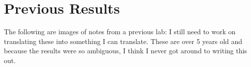 \documentclass{article}
\begin{document}
\section{Previous Results}

The following are images of notes from a previous lab: I still need to work on translating these into something I can translate. These are over 5 years old and because the results were so ambiguous, I think I never got around to writing this out.

\begin{figure}
	\label{fig:IMG_0578}
\end{figure}

\begin{figure}
	\label{fig:IMG_0576}
\end{figure}

\begin{figure}
	\label{fig:IMG_0579}
\end{figure}


\begin{figure}
	\label{fig:IMG_0577}
\end{figure}
\end{document}
